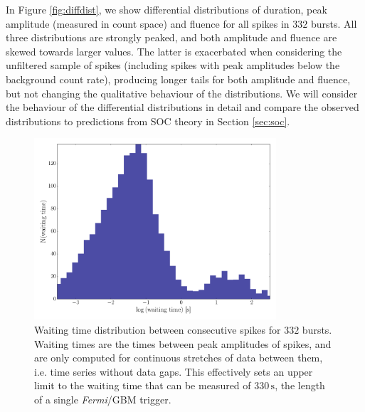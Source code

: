 \documentclass[12pt]{emulateapj}
\newcommand{\project}[1]{\textsl{#1}}
\newcommand{\fermi}{\project{Fermi}}
\begin{document}
 
 In Figure \ref{fig:diffdist}, we show differential distributions of duration, peak amplitude (measured in count space) and fluence for all spikes in $332$ bursts. All three distributions are
 strongly peaked, and both amplitude and fluence are skewed towards larger values. The latter is exacerbated when considering the unfiltered sample of 
 spikes (including spikes with peak amplitudes below the background count rate), producing longer tails for both amplitude and fluence, but not changing the qualitative behaviour of the distributions. We will consider the behaviour of
 the differential distributions in detail and compare the observed distributions to predictions from SOC theory in Section \ref{sec:soc}.

 \begin{figure}[htbp]
\begin{center}
\includegraphics[width=9cm]{sgr1550_waitingtimes.pdf}
\caption{Waiting time distribution between consecutive spikes for $332$ bursts. Waiting times are the times between peak amplitudes of spikes, and are only computed for
continuous stretches of data between them, i.e. time series without data gaps. This effectively sets an upper limit to the waiting time that can be measured of $330\,\mathrm{s}$, the 
length of a single \fermi/GBM trigger.}
\label{fig:waitingtimes}
\end{center}
\end{figure}
\end{document}
